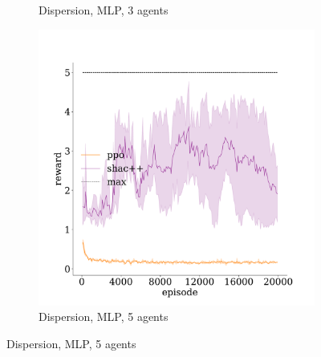 \begin{figure}[t]
\begin{subfigure}[b]{0.32\textwidth}
        \caption{Dispersion, MLP, 3 agents}
        \label{apx:fig:dispersion-mlp-3}
    \end{subfigure}
    \begin{subfigure}[b]{0.32\textwidth}
        \includegraphics[width=\textwidth]{figs/dispersion-5-mlp.pdf}
        \caption{Dispersion, MLP, 5 agents}
        \label{apx:fig:dispersion-mlp-5}
    \end{subfigure}


\end{figure}

